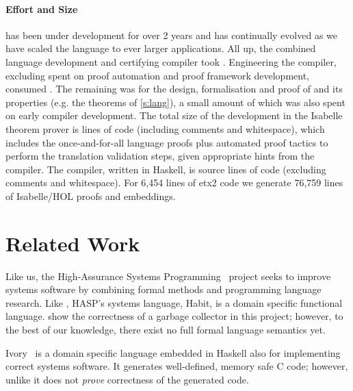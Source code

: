 \documentclass[9pt\ifFinal\else,preprint,nocopyrightspace\fi,\ifAlpha\else natbib,authoryear\fi]{sigplanconf}
\begin{document}
\begin{figure*}[t]
\begin{center}
\begin{inductive0}
\newcommand{\isabelleLOC}{ lines of code (including comments and whitespace)\xspace}

\newcommand{\compilerSLOC}{ source lines of code (excluding comments and whitespace)\xspace}

\newcommand{\exttwoloc}{6,454\xspace}
\newcommand{\extproof}{76,759\xspace}

\paragraph{Effort and Size} \CDSL has been
under development for over 2 years and has continually evolved
as we have scaled the language to ever larger applications.
All up, the combined language development
and certifying compiler took \totalEffort. Engineering the
\CDSL compiler, excluding \certcompEffort spent on
proof automation and proof framework development,
consumed \compilerEffort. The remaining \langproofEffort was for the
design, formalisation and proof of \CDSL and its properties (e.g. the
theorems of \autoref{s:lang}), a small amount of which was also spent on
early compiler development.
The total size of the development in
the Isabelle theorem prover is \isabelleLOC, which includes the
once-and-for-all language proofs plus automated proof tactics to perform
the translation validation steps, given appropriate hints from the \CDSL
compiler. The \CDSL compiler, written in Haskell, is \compilerSLOC.
For \exttwoloc lines of etx2 \cdsl code we generate \extproof lines of Isabelle/HOL proofs
and embeddings.



\section{Related Work}\label{s:related}

Like us, the High-Assurance Systems Programming~\citet{Habit:lang} pro\-ject 
seeks to improve systems software by combining formal 
methods and programming language research. Like \CDSL, 
HASP's systems
language, Habit, is a domain specific functional language. 
\citet{McCreight_CT_10} show the correctness of a garbage collector in this project; however, to the best 
of our knowledge, there exist no full formal language semantics yet. 

Ivory~\citep{Pike_HBEDL_14} is a domain specific language embedded in Haskell
also for implementing correct systems software. It generates well-defined,
memory safe C code; however, unlike \CDSL it does not \emph{prove} correctness
of the generated code.


\end{inductive0}
\end{center}
\end{figure*}
\end{document}
